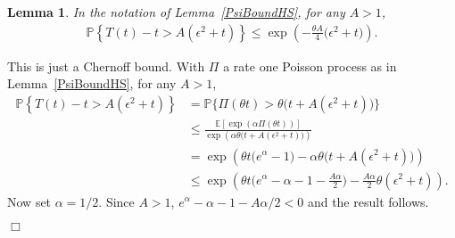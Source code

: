 \documentclass[12pt]{article}
\newenvironment {proof}{{\noindent\bf Proof }}{\hfill $\Box$ \medskip}
\newtheorem{lemma}[theorem]{Lemma}
\newcommand{\IP}{\mathbb P}
\newcommand{\IE}{\mathbb E}
\numberwithin{equation}{section}
\begin{document}
\begin{lemma}
    \label{lem:poisson_ld}
    In the notation of Lemma~\ref{PsiBoundHS}, for any $A>1$,
    \begin{align*}
        \IP\left\{
            T(t) - t > A(\epsilon^2 + t)
        \right\}
    \le
	    \exp\left(-\frac{\theta A}{4}\big(\epsilon^2+t\big)
	    \right) .
    \end{align*}
\end{lemma}

\begin{proof}
    This is just a Chernoff bound. With $\Pi$ a rate one Poisson process as
	in Lemma~\ref{PsiBoundHS}, for any $A>1$,
	\begin{align*}
        \IP\left\{
            T(t) - t > A(\epsilon^2 + t)
        \right\}
&=
        \IP\Big\{
            \Pi(\theta t)
            >
		\theta\Big( t + A(\epsilon^2 + t)\Big)
        \Big\} \\
&\leq\frac{\IE\left[\exp\left(\alpha\Pi(\theta t)\right)\right]}
		{\exp\left(\alpha\theta\big(t+A(\epsilon^2+t)\big)\right)}
		\\
		&=\exp\left(\theta t\big(e^\alpha-1\big)-\alpha\theta\big(t+A(\epsilon^2+t)\big)\right)
		\\
		&\leq
		\exp\left(\theta t\big(e^\alpha-\alpha-1-\frac{A\alpha}{2}\big)
		-\frac{A\alpha}{2}\theta(\epsilon^2+t)\right).
    \end{align*}
	Now set $\alpha=1/2$. Since $A>1$, $e^\alpha-\alpha-1-A\alpha/2<0$ and the 
	result follows.

\end{proof}
\end{document}
